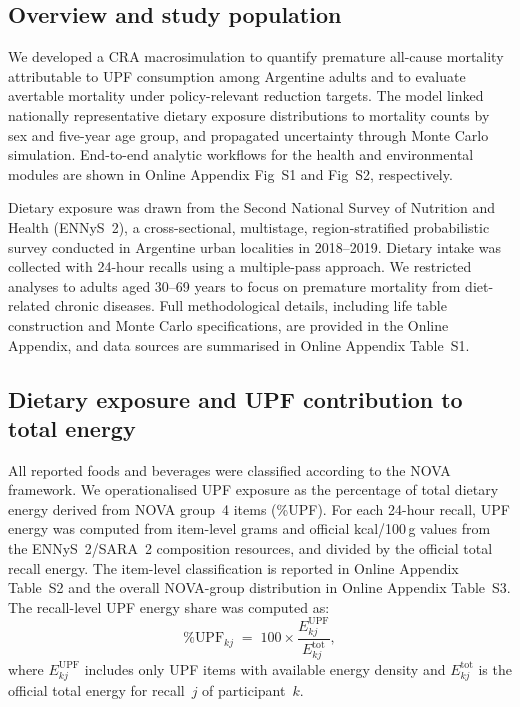 ﻿\documentclass{article}
\begin{document}
\subsection{Overview and study population}

We developed a CRA macrosimulation\cite{Murray2003,WHO2004CQR,Forouzanfar2015} to quantify premature all-cause mortality attributable to UPF consumption among Argentine adults and to evaluate avertable mortality under policy-relevant reduction targets. The model linked nationally representative dietary exposure distributions to mortality counts by sex and five-year age group, and propagated uncertainty through Monte Carlo simulation. End-to-end analytic workflows for the health and environmental modules are shown in Online Appendix Fig~S1 and Fig~S2, respectively.

Dietary exposure was drawn from the Second National Survey of Nutrition and Health (ENNyS~2), a cross-sectional, multistage, region-stratified probabilistic survey conducted in Argentine urban localities in 2018--2019.\cite{ENNYS22019,ENNYS2Dataset} Dietary intake was collected with 24-hour recalls using a multiple-pass approach.\cite{ENNYS22019} We restricted analyses to adults aged 30--69 years to focus on premature mortality from diet-related chronic diseases. Full methodological details, including life table construction and Monte Carlo specifications, are provided in the Online Appendix, and data sources are summarised in Online Appendix Table~S1.

\subsection{Dietary exposure and UPF contribution to total energy}

All reported foods and beverages were classified according to the NOVA framework.\cite{Monteiro2019UPFIdentify} We operationalised UPF exposure as the percentage of total dietary energy derived from NOVA group~4 items (\%UPF). For each 24-hour recall, UPF energy was computed from item-level grams and official kcal/100\,g values from the ENNyS~2/SARA~2 composition resources,\cite{SARA22022} and divided by the official total recall energy. The item-level classification is reported in Online Appendix Table~S2 and the overall NOVA-group distribution in Online Appendix Table~S3. The recall-level UPF energy share was computed as:
%
\begin{equation}
\%\text{UPF}_{kj} \;=\; 100 \times \frac{E^{\text{UPF}}_{kj}}{E^{\text{tot}}_{kj}},
\end{equation}
%
where $E^{\text{UPF}}_{kj}$ includes only UPF items with available energy density and $E^{\text{tot}}_{kj}$ is the official total energy for recall~$j$ of participant~$k$. 
\end{document}
